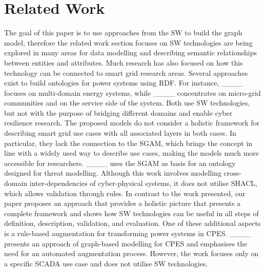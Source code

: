 \section{Related Work}
\label{subsec:furtherwork}
The goal of this paper is to use approaches from the \ac{SW} to build the graph model, therefore the related work section focuses on  
\ac{SW} technologies are being explored in many areas for data modelling and describing semantic relationships between entities and attributes. Much research has also focused on how this technology can be connected to smart grid research areas.
Several approaches exist to build ontologies for power systems using \ac{RDF}.
For instance, ____ focuses on multi-domain energy systems, while ____ concentrates on micro-grid communities and on the service side of the system.
Both use \ac{SW} technologies, but not with the purpose of bridging different domains and enable cyber resilience research.
The proposed models do not consider a holistic framework for describing smart grid use cases with all associated layers in both cases. In particular, they lack the connection to the \ac{SGAM}, which brings the concept in line with a widely used way to describe use cases, making the models much more accessible for researchers.
____ uses the \ac{SGAM} as basis for an ontology designed for threat modelling.
Although this work involves modelling cross-domain inter-dependencies of cyber-physical systems, it does not utilise SHACL, which allows validation through rules.
In contrast to the work presented, our paper proposes an approach that provides a holistic picture that presents a complete framework and shows how \ac{SW} technologies can be useful in all steps of definition, description, validation, and evaluation.
One of these additional aspects is a rule-based augmentation for transforming power systems in \ac{CPES}.
____ presents an approach of graph-based modelling for \ac{CPES} and emphasises the need for an automated augmentation process. However, the work focuses only on a specific \ac{SCADA} use case and does not utilise \ac{SW} technologies. 




